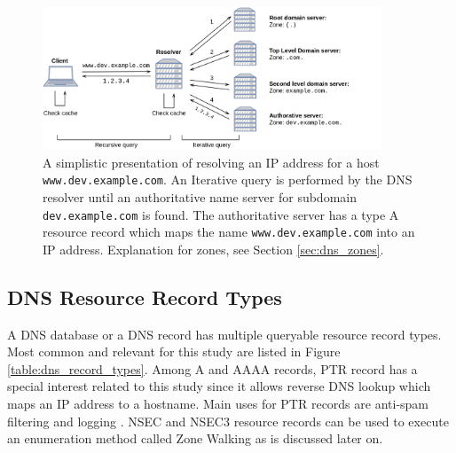 \begin{figure}[htb]
  \begin{center}
    \includegraphics[width=0.9\textwidth]{resolving2.png}
    \caption{A simplistic presentation of resolving an IP address for a host \texttt{www.dev.example.com}. An Iterative query is performed by the DNS resolver until an authoritative name server for subdomain \texttt{dev.example.com} is found. The authoritative server has a type A resource record which maps the name \texttt{www.dev.example.com} into an IP address. Explanation for zones, see Section \ref{sec:dns_zones}.}
    \label{fig:resolving}
  \end{center}
\end{figure}

\subsection{DNS Resource Record Types}

A DNS database or a DNS record has multiple queryable resource record types. Most common and relevant for this study are listed in Figure \ref{table:dns_record_types}. Among \textsf{A} and \textsf{AAAA} records,  \textsf{PTR} record has a special interest related to this study since it allows reverse DNS lookup which maps an IP address to a hostname. Main uses for PTR records are anti-spam filtering and logging \cite{PTR_uses}. \textsf{NSEC} and \textsf{NSEC3} resource records can be used to execute an enumeration method called \textsf{Zone Walking} as is discussed later on.


